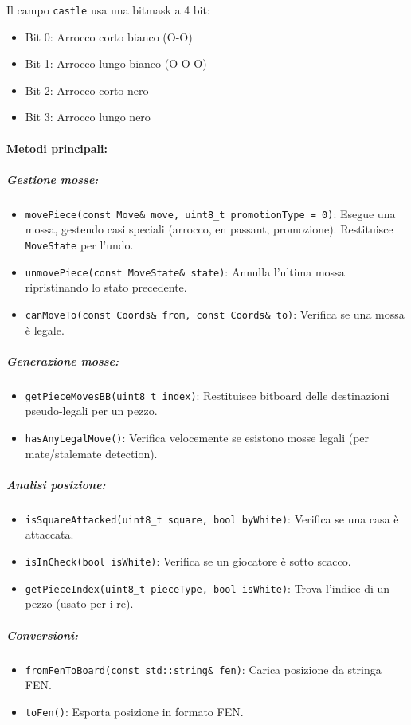 Il campo \texttt{castle} usa una bitmask a 4 bit:
\begin{itemize}
  \item Bit 0: Arrocco corto bianco (O-O)
  \item Bit 1: Arrocco lungo bianco (O-O-O)
  \item Bit 2: Arrocco corto nero
  \item Bit 3: Arrocco lungo nero
\end{itemize}

\paragraph{Metodi principali:}

\subparagraph{Gestione mosse:}
\begin{itemize}
  \item \texttt{movePiece(const Move\& move, uint8\_t promotionType = 0)}: Esegue una mossa,
        gestendo casi speciali (arrocco, en passant, promozione). Restituisce \texttt{MoveState} per l'undo.
  \item \texttt{unmovePiece(const MoveState\& state)}: Annulla l'ultima mossa ripristinando lo stato precedente.
  \item \texttt{canMoveTo(const Coords\& from, const Coords\& to)}: Verifica se una mossa è legale.
\end{itemize}

\subparagraph{Generazione mosse:}
\begin{itemize}
  \item \texttt{getPieceMovesBB(uint8\_t index)}: Restituisce bitboard delle destinazioni pseudo-legali per un pezzo.
  \item \texttt{hasAnyLegalMove()}: Verifica velocemente se esistono mosse legali (per mate/stalemate detection).
\end{itemize}

\subparagraph{Analisi posizione:}
\begin{itemize}
  \item \texttt{isSquareAttacked(uint8\_t square, bool byWhite)}: Verifica se una casa è attaccata.
  \item \texttt{isInCheck(bool isWhite)}: Verifica se un giocatore è sotto scacco.
  \item \texttt{getPieceIndex(uint8\_t pieceType, bool isWhite)}: Trova l'indice di un pezzo (usato per i re).
\end{itemize}

\subparagraph{Conversioni:}
\begin{itemize}
  \item \texttt{fromFenToBoard(const std::string\& fen)}: Carica posizione da stringa FEN.
  \item \texttt{toFen()}: Esporta posizione in formato FEN.
\end{itemize}

